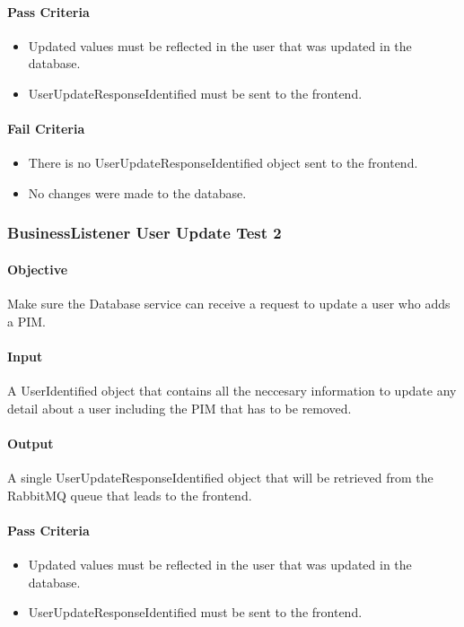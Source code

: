 \documentclass[hidelinks,english]{article}
\begin{document}
				\paragraph{Pass Criteria}
				\begin{itemize}
					\item Updated values must be reflected in the user that was updated in the database.
					\item UserUpdateResponseIdentified must be sent to the frontend.
				\end{itemize}
				\paragraph{Fail Criteria}
				\begin{itemize}
					\item There is no UserUpdateResponseIdentified object sent to the frontend.
					\item No changes were made to the database.
				\end{itemize}
				
				\subsubsection{BusinessListener User Update Test 2}\label{databasebusinesslistenerupdatetest2}
				\paragraph{Objective} Make sure the Database service can receive a request to update a user who adds a PIM.
				\paragraph{Input} A UserIdentified object that contains all the neccesary information to update any detail about a user including the PIM that has to be removed.
				\paragraph{Output} A single UserUpdateResponseIdentified object that will be retrieved from the RabbitMQ queue that leads to the frontend.
				\paragraph{Pass Criteria}
				\begin{itemize}
					\item Updated values must be reflected in the user that was updated in the database.
					\item UserUpdateResponseIdentified must be sent to the frontend.
				\end{itemize}
\end{document}
